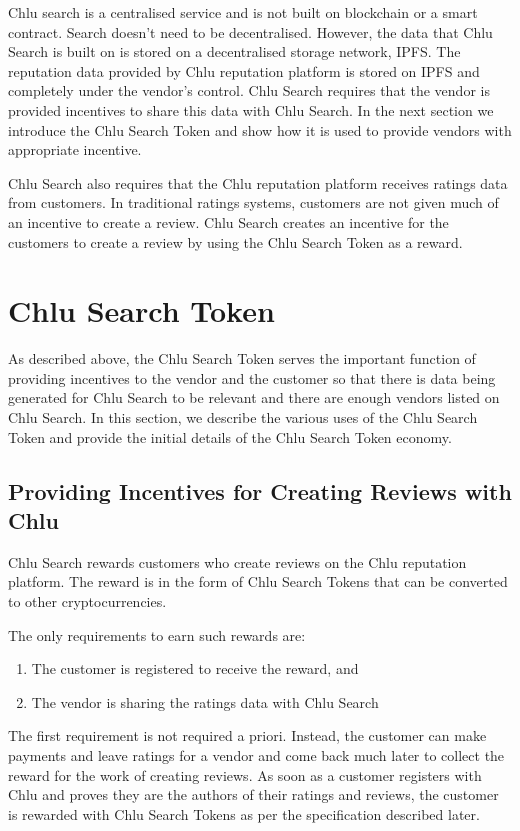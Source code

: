 \documentclass[a4paper]{article}
\begin{document}
Chlu search is a centralised service and is not built on blockchain or
a smart contract. Search doesn't need to be decentralised. However,
the data that Chlu Search is built on is stored on a decentralised
storage network, IPFS. The reputation data provided by Chlu reputation
platform is stored on IPFS and completely under the vendor's
control. Chlu Search requires that the vendor is provided incentives
to share this data with Chlu Search. In the next section we introduce
the Chlu Search Token and show how it is used to provide vendors with
appropriate incentive.

Chlu Search also requires that the Chlu reputation platform receives
ratings data from customers. In traditional ratings systems, customers
are not given much of an incentive to create a review. Chlu Search
creates an incentive for the customers to create a review by using the
Chlu Search Token as a reward.

\section{Chlu Search Token}

As described above, the Chlu Search Token serves the important
function of providing incentives to the vendor and the customer so
that there is data being generated for Chlu Search to be relevant and
there are enough vendors listed on Chlu Search. In this section, we
describe the various uses of the Chlu Search Token and provide the
initial details of the Chlu Search Token economy.

\subsection{Providing Incentives for Creating Reviews with Chlu}

Chlu Search rewards customers who create reviews on the Chlu
reputation platform. The reward is in the form of Chlu Search Tokens
that can be converted to other cryptocurrencies.

The only requirements to earn such rewards are:

\begin{enumerate}
\item The customer is registered to receive the reward, and
\item The vendor is sharing the ratings data with Chlu Search
\end{enumerate}

The first requirement is not required a priori. Instead, the customer
can make payments and leave ratings for a vendor and come back much
later to collect the reward for the work of creating reviews. As soon
as a customer registers with Chlu and proves they are the authors of
their ratings and reviews, the customer is rewarded with Chlu Search
Tokens as per the specification described later.
\end{document}
